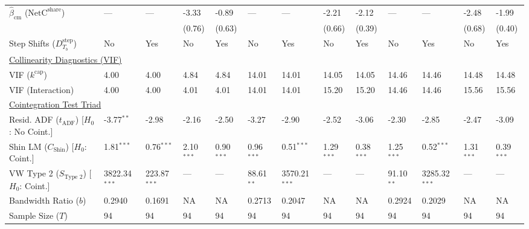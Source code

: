 \begin{table}[H]
\begin{tabular}{p{3.8cm}p{1.5cm}p{1.5cm}p{1.5cm}p{1.5cm}p{1.5cm}p{1.5cm}p{1.5cm}p{1.5cm}p{1.5cm}p{1.5cm}p{1.5cm}p{1.5cm}}
$\hat{\beta}_{\text{cm}}$ ($\text{NetC}^{\text{share}}$)  & --- & --- & -3.33 & -0.89 & --- & --- & -2.21 & -2.12 & --- & --- & -2.48 & -1.99  \\
 &  &  & {\scriptsize (0.76)} & {\scriptsize (0.63)} &  &  & {\scriptsize (0.66)} & {\scriptsize (0.39)} &  &  & {\scriptsize (0.68)} & {\scriptsize (0.40)}  \\
Step Shifts ($D^{\text{step}}_{T_b}$)  & No & Yes & No & Yes & No & Yes & No & Yes & No & Yes & No & Yes  \\
\midrule
\multicolumn{13}{l}{\underline{Collinearity Diagnostics (VIF)}} \\
VIF ($k^{\text{cap}}$) & 4.00 & 4.00 & 4.84 & 4.84 & 14.01 & 14.01 & 14.05 & 14.05 & 14.46 & 14.46 & 14.48 & 14.48  \\
VIF (Interaction) & 4.00 & 4.00 & 4.01 & 4.01 & 14.01 & 14.01 & 15.20 & 15.20 & 14.46 & 14.46 & 15.56 & 15.56  \\
\midrule
\multicolumn{13}{l}{\underline{Cointegration Test Triad}} \\
\makecell[l]{Resid. ADF ($t_{\text{ADF}}$) \\ {\scriptsize [$H_0$: No Coint.]}} & -3.77$^{**}$ & -2.98 & -2.16 & -2.50 & -3.27 & -2.90 & -2.52 & -3.06 & -2.30 & -2.85 & -2.47 & -3.09  \\
\makecell[l]{Shin LM ($C_{\text{Shin}}$) \\ {\scriptsize [$H_0$: Coint.]}} & 1.81$^{***}$ & 0.76$^{***}$ & 2.10$^{***}$ & 0.90$^{***}$ & 0.96$^{***}$ & 0.51$^{***}$ & 1.29$^{***}$ & 0.38$^{***}$ & 1.25$^{***}$ & 0.52$^{***}$ & 1.31$^{***}$ & 0.39$^{***}$  \\
\makecell[l]{VW Type 2 ($S_{\text{Type 2}}$) \\ {\scriptsize [$H_0$: Coint.]}} & 3822.34$^{***}$ & 223.87$^{***}$ & --- & --- & 88.61$^{**}$ & 3570.21$^{***}$ & --- & --- & 91.10$^{**}$ & 3285.32$^{***}$ & --- & ---  \\
\midrule
Bandwidth Ratio ($b$) & 0.2940 & 0.1691 & NA & NA & 0.2713 & 0.2047 & NA & NA & 0.2924 & 0.2029 & NA & NA  \\
Sample Size ($T$) & 94 & 94 & 94 & 94 & 94 & 94 & 94 & 94 & 94 & 94 & 94 & 94  \\
\bottomrule

\end{tabular}
\end{table}
